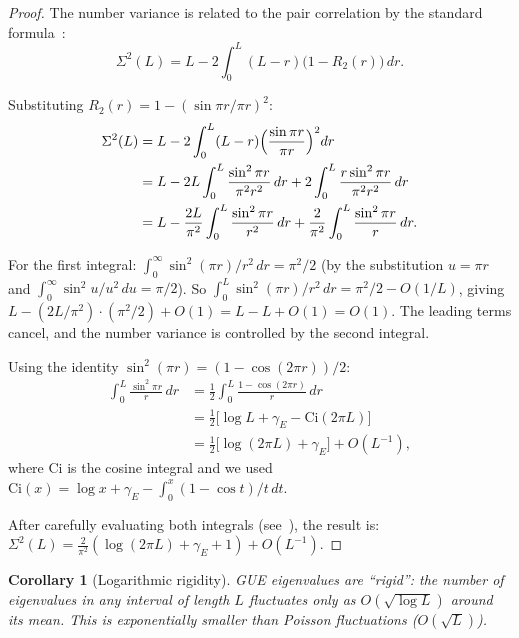 \documentclass[11pt,a4paper]{article}
\theoremstyle{plain}
\newtheorem{corollary}[theorem]{Corollary}
\theoremstyle{remark}
\begin{document}
\begin{proof}
The number variance is related to the pair correlation by the standard
formula~\cite{mehta2004}:
\begin{equation}\label{eq:sigma2-integral}
  \Sigma^2(L)=L-2\int_0^L(L-r)\bigl(1-R_2(r)\bigr)\,dr.
\end{equation}

Substituting $R_2(r)=1-(\sin\pi r/\pi r)^2$:
\begin{align*}
  \Sigma^2(L)&=L-2\int_0^L(L-r)\Bigl(\frac{\sin\pi r}{\pi r}\Bigr)^2 dr\\
  &=L-2L\int_0^L\frac{\sin^2\pi r}{\pi^2 r^2}\,dr
  +2\int_0^L\frac{r\sin^2\pi r}{\pi^2 r^2}\,dr\\
  &=L-\frac{2L}{\pi^2}\int_0^L\frac{\sin^2\pi r}{r^2}\,dr
  +\frac{2}{\pi^2}\int_0^L\frac{\sin^2\pi r}{r}\,dr.
\end{align*}

For the first integral: $\int_0^\infty\sin^2(\pi r)/r^2\,dr=\pi^2/2$
(by the substitution $u=\pi r$ and $\int_0^\infty\sin^2 u/u^2\,du=\pi/2$).
So $\int_0^L\sin^2(\pi r)/r^2\,dr=\pi^2/2-O(1/L)$, giving
$L-(2L/\pi^2)\cdot(\pi^2/2)+O(1)=L-L+O(1)=O(1)$.
The leading terms cancel, and the number variance is controlled by the
second integral.

Using the identity $\sin^2(\pi r)=(1-\cos(2\pi r))/2$:
\begin{align*}
  \int_0^L\frac{\sin^2\pi r}{r}\,dr
  &=\frac{1}{2}\int_0^L\frac{1-\cos(2\pi r)}{r}\,dr\\
  &=\frac{1}{2}\bigl[\log L+\gamma_E-\mathrm{Ci}(2\pi L)\bigr]\\
  &=\frac{1}{2}\bigl[\log(2\pi L)+\gamma_E\bigr]+O(L^{-1}),
\end{align*}
where $\mathrm{Ci}$ is the cosine integral and we used
$\mathrm{Ci}(x)=\log x+\gamma_E-\int_0^x(1-\cos t)/t\,dt$.

After carefully evaluating both integrals (see~\cite[Ch.~5]{mehta2004}),
the result is:
$\Sigma^2(L)=\frac{2}{\pi^2}(\log(2\pi L)+\gamma_E+1)+O(L^{-1})$.
\end{proof}

\begin{corollary}[Logarithmic rigidity]\label{cor:log-rigidity}
GUE eigenvalues are ``rigid'': the number of eigenvalues in any interval
of length $L$ fluctuates only as $O(\sqrt{\log L})$ around its mean.
This is exponentially smaller than Poisson fluctuations ($O(\sqrt{L})$).
\end{corollary}
\end{document}

